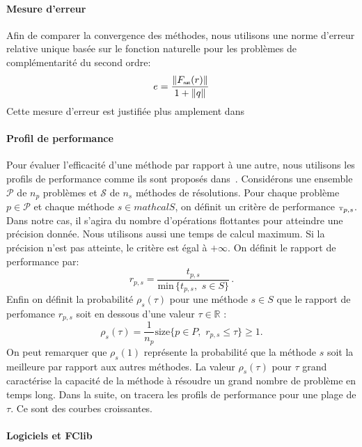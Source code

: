 \documentclass{CSMA2017}
\def\t{{\hbox{\tiny{T}}}}
\def\nat{{\hbox{\sf \tiny{nat}}}}
\begin{document}
\paragraph{Mesure d'erreur} Afin de comparer la convergence des méthodes, nous utilisons une norme d'erreur relative unique basée sur le fonction naturelle pour les problèmes de complémentarité du second ordre:
\begin{equation}
   e = \displaystyle\frac{\|F_\nat(r)\|}{1+ \|q\|}
\end{equation}
Cette mesure d'erreur est justifiée plus amplement dans \cite{Facchinei.Pang2003}

\paragraph{Profil de performance} Pour évaluer l'efficacité d'une méthode par rapport à une autre, nous utilisons les profils de performance comme ils sont proposés dans~\cite{DolanMore_MP2002}. Considérons une ensemble $\mathcal P$ de $n_p$ problèmes et $\mathcal S$  de $n_s$ méthodes de résolutions. Pour chaque problème $p\in \mathcal P$ et chaque méthode $s \in mathcal S$, on définit un critère de performance $\t_{p,s}$. Dans notre cas, il s'agira du nombre d'opérations flottantes pour atteindre une précision donnée. Nous utilisons aussi une temps de calcul maximum. Si la précision n'est pas atteinte, le critère est égal à $+\infty$. On définit le rapport de performance par:  
\begin{equation}
 r_{p, s} = \frac{t_{p,s}}{\text{min}\, \{t_{p,s}, \, \, s \in S\}} \, .
\end{equation}
Enfin on définit la probabilité  $\rho_s(\tau)$ pour une méthode $s \in S$ que le rapport de perfomance $r_{p, s}$ soit en dessous d'une valeur $\tau \in \mathbb R$ :
\begin{equation}
 \rho_s(\tau) = \frac{1}{n_p} \text{size} \{p \in P, \, \, r_{p, s} \leq \tau\} \geq 1.
\end{equation}
On peut remarquer que $\rho_s(1)$ représente la probabilité que la méthode $s$ soit la meilleure par rapport aux autres méthodes. La valeur $\rho_s(\tau)$ pour $\tau$ grand caractérise la capacité de la méthode à résoudre un grand nombre de problème en temps long. Dans la suite, on tracera les profils de performance pour une plage de $\tau$. Ce sont des courbes croissantes. 

\paragraph{Logiciels et FClib}
\end{document}
